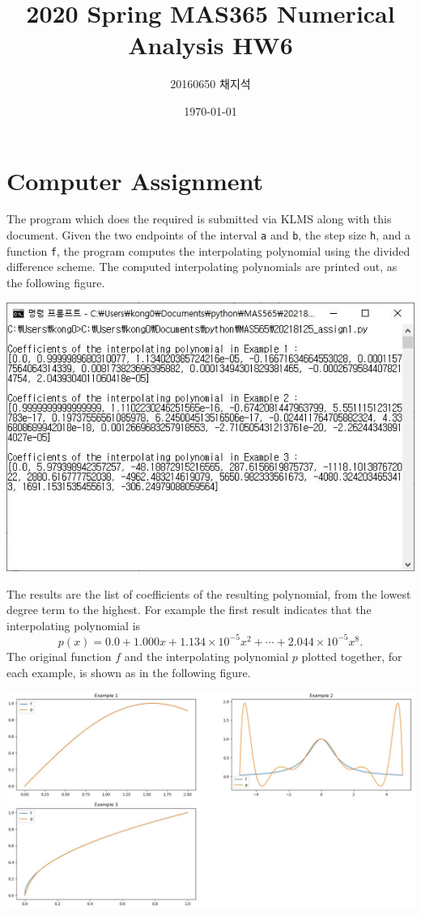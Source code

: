 \documentclass{article}
\title{2020 Spring MAS365 Numerical Analysis HW6}
\author{20160650 채지석}
\date{\today}
\begin{document}
\section*{Computer Assignment}
The program which does the required is submitted via KLMS along with this document. Given the two endpoints of the interval \texttt{a} and \texttt{b}, the step size \texttt{h}, and a function \texttt{f}, the program computes the interpolating polynomial using the divided difference scheme. The computed interpolating polynomials are printed out, as the following figure. 
\begin{center}
    \includegraphics[width=0.8\linewidth]{console.JPG}
\end{center}
The results are the list of coefficients of the resulting polynomial, from the lowest degree term to the highest. For example the first result indicates that the interpolating polynomial is \[
p(x) = 0.0 + 1.000 x + 1.134\times 10^{-5} x^2 + \cdots + 2.044\times 10^{-5} x^8. 
\] The original function $f$ and the interpolating polynomial $p$ plotted together, for each example, is shown as in the following figure. 
\begin{center}
    \includegraphics[width=\linewidth]{3313.JPG}
\end{center}
\end{document}
